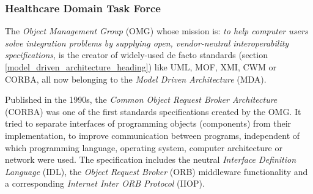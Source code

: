 %
%
%
%
%
%
%

\subsubsection{Healthcare Domain Task Force}
\label{healthcare_domain_task_force_heading}

The \emph{Object Management Group} (OMG) whose mission is: \textit{to help
computer users solve integration problems by supplying open, vendor-neutral
interoperability specifications}, is the creator of widely-used de facto
standards (section \ref{model_driven_architecture_heading}) like UML, MOF, XMI,
CWM or CORBA, all now belonging to the \emph{Model Driven Architecture} (MDA).

Published in the 1990s, the \emph{Common Object Request Broker Architecture}
(CORBA) was one of the first standards specifications created by the OMG. It
tried to separate interfaces of programming objects (components) from their
implementation, to improve communication between programs, independent of which
programming language, operating system, computer architecture or network were
used. The specification includes the neutral \emph{Interface Definition Language}
(IDL), the \emph{Object Request Broker} (ORB) middleware functionality and a
corresponding \emph{Internet Inter ORB Protocol} (IIOP).

